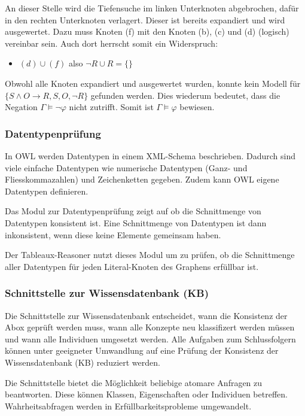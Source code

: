 An dieser Stelle wird die Tiefensuche im linken Unterknoten abgebrochen, dafür in den rechten Unterknoten verlagert. Dieser ist bereits expandiert und wird ausgewertet. Dazu muss Knoten (f) mit den Knoten (b), (c) und (d) (logisch) vereinbar sein. Auch dort herrscht somit ein Widerspruch:
\begin{itemize}
    \item $(d) \cup (f)$ also $\neg R \cup R = \{\}$
\end{itemize}

Obwohl alle Knoten expandiert und ausgewertet wurden,  konnte kein Modell für $\{S \wedge O \rightarrow R, S, O, \neg R\}$ gefunden werden. Dies wiederum bedeutet, dass die Negation $\Gamma \models \neg\varphi$ nicht zutrifft. Somit ist $\Gamma \models \varphi$ bewiesen.

\subsubsection{Datentypenprüfung}
\label{ssubsection:inferenz_pellet_datatypes}
In OWL werden Datentypen in einem XML-Schema beschrieben. Dadurch sind viele einfache Datentypen wie numerische Datentypen (Ganz- und Fliesskommazahlen) und Zeichenketten gegeben. Zudem kann OWL eigene Datentypen definieren.

Das Modul zur Datentypenprüfung zeigt auf ob die Schnittmenge von Datentypen konsistent ist. Eine Schnittmenge von Datentypen ist dann inkonsistent, wenn diese keine Elemente gemeinsam haben.

Der Tableaux-Reasoner nutzt dieses Modul um zu prüfen, ob die Schnittmenge aller Datentypen für jeden Literal-Knoten des Graphens erfüllbar ist.

\subsubsection{Schnittstelle zur Wissensdatenbank (KB)}
\label{ssubsection:inferenz_pellet_kb}
Die Schnittstelle zur Wissensdatenbank entscheidet, wann die Konsistenz der Abox geprüft werden muss, wann alle Konzepte neu klassifizert werden müssen und wann alle Individuen umgesetzt werden. Alle Aufgaben zum Schlussfolgern können unter geeigneter Umwandlung auf eine Prüfung der Konsistenz der Wissensdatenbank (KB) reduziert werden.

Die Schnittstelle bietet die Möglichkeit beliebige atomare Anfragen zu beantworten. Diese können Klassen, Eigenschaften oder Individuen betreffen. Wahrheitsabfragen werden in Erfüllbarkeitsprobleme umgewandelt.

